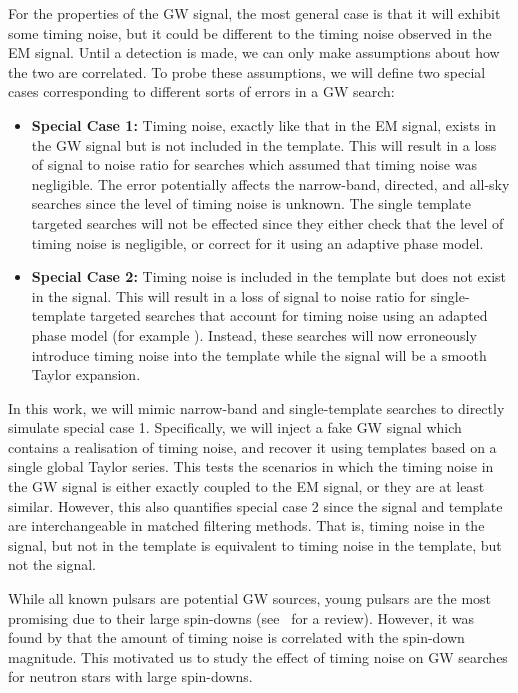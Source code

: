 \documentclass[../full_thesis/full_thesis.tex]{subfiles}
\begin{document}
For the properties of the GW signal, the most general case is that it will
exhibit some timing noise, but it could be different to the timing noise
observed in the EM signal. Until a detection is made, we can only make
assumptions about how the two are correlated. To probe these assumptions, we
will define two special cases corresponding to different sorts of errors in a
GW search:
\begin{itemize}

\item {\bf Special Case 1:} Timing noise, exactly like that in the EM signal,
exists in the GW signal but is not included in the template. This will result
in a loss of signal to noise ratio for searches which assumed that timing noise
was negligible. The error potentially affects the narrow-band, directed, and
all-sky searches since the level of timing noise is unknown. The single
template targeted searches will not be effected since they either check that
the level of timing noise is negligible, or correct for it using an adaptive
phase model.


\item {\bf Special Case 2:} Timing noise is included in the template but does
    not exist in the signal. This will result in a loss of signal to noise
    ratio for single-template targeted searches that account for timing noise
    using an adapted phase model (for example \citet{ligo2008}).  Instead,
    these searches will now erroneously introduce timing noise into the
    template while the signal will be a smooth Taylor expansion.

\end{itemize}

In this work, we will mimic narrow-band and single-template searches to
directly simulate special case 1. Specifically, we will inject a fake GW signal
which contains a realisation of timing noise, and recover it using templates
based on a single global Taylor series. This tests the scenarios in which the
timing noise in the GW signal is either exactly coupled to the EM signal, or
they are at least similar.  However, this also quantifies special case 2 since
the signal and template are interchangeable in matched filtering methods.  That
is, timing noise in the signal, but not in the template is equivalent to timing
noise in the template, but not the signal.

While all known pulsars are potential GW sources, young pulsars are the most
promising due to their large spin-downs (see~\citet{ligo2010} for a review).
However, it was found by \citet{Hobbs2010} that the amount of timing noise is
correlated with the spin-down  magnitude. This motivated us to study the effect
of timing noise on GW searches for neutron stars with large spin-downs.
\end{document}
